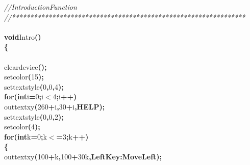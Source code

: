 \documentclass[a4paper, 10pt]{article}
\newcommand\SPC{\hspace*{0.6em}}
\newcommand\HYP{\mbox{\char 45}}
\newcommand\QOT{\mbox{\char 34}}
\newcommand{\CppAComment}[1]{\textit{\textcolor[rgb]{0.2,0.6,1}{#1}}}
\newcommand{\CppAIdentifier}[1]{#1}
\newcommand{\CppANumber}[1]{\textcolor[rgb]{0.5,0,0.5}{#1}}
\newcommand{\CppAReservedWord}[1]{\textbf{#1}}
\newcommand{\CppASpace}[1]{\colorbox[rgb]{1,1,1}{#1}}
\newcommand{\CppAString}[1]{\textbf{\textcolor[rgb]{0,0,1}{#1}}}
\newcommand{\CppASymbol}[1]{\textbf{\textcolor[rgb]{1,0,0}{#1}}}
\begin{document}
\begin{ttfamily}
\CppAComment{//\SPC \SPC \SPC Introduction\SPC Function}\\
\CppAComment{//****************************************************************}\\
\\
\CppAReservedWord{void}\CppASpace{\SPC }\CppAIdentifier{Intro}\CppASymbol{(}\CppASymbol{)}\\
\CppASymbol{\{}\\
\\
\CppASpace{\SPC \SPC \SPC }\CppAIdentifier{cleardevice}\CppASymbol{(}\CppASymbol{)}\CppASymbol{;}\\
\CppASpace{\SPC \SPC \SPC }\CppAIdentifier{setcolor}\CppASymbol{(}\CppANumber{15}\CppASymbol{)}\CppASymbol{;}\\
\CppASpace{\SPC \SPC \SPC }\CppAIdentifier{settextstyle}\CppASymbol{(}\CppANumber{0}\CppASymbol{,}\CppANumber{0}\CppASymbol{,}\CppANumber{4}\CppASymbol{)}\CppASymbol{;}\\
\CppASpace{\SPC \SPC \SPC }\CppAReservedWord{for}\CppASymbol{(}\CppAReservedWord{int}\CppASpace{\SPC }\CppAIdentifier{i}\CppASymbol{=}\CppANumber{0}\CppASymbol{;}\CppAIdentifier{i}\CppASymbol{$<$}\CppANumber{4}\CppASymbol{;}\CppAIdentifier{i}\CppASymbol{++}\CppASymbol{)}\\
\CppASpace{\SPC \SPC \SPC }\CppAIdentifier{outtextxy}\CppASymbol{(}\CppANumber{260}\CppASymbol{+}\CppAIdentifier{i}\CppASymbol{,}\CppANumber{30}\CppASymbol{+}\CppAIdentifier{i}\CppASymbol{,}\CppAString{\QOT HELP\QOT }\CppASymbol{)}\CppASymbol{;}\\
\CppASpace{\SPC \SPC \SPC }\CppAIdentifier{settextstyle}\CppASymbol{(}\CppANumber{0}\CppASymbol{,}\CppANumber{0}\CppASymbol{,}\CppANumber{2}\CppASymbol{)}\CppASymbol{;}\\
\CppASpace{\SPC \SPC \SPC }\CppAIdentifier{setcolor}\CppASymbol{(}\CppANumber{4}\CppASymbol{)}\CppASymbol{;}\\
\CppASpace{\SPC \SPC \SPC }\CppAReservedWord{for}\CppASymbol{(}\CppAReservedWord{int}\CppASpace{\SPC }\CppAIdentifier{k}\CppASymbol{=}\CppANumber{0}\CppASymbol{;}\CppAIdentifier{k}\CppASymbol{$<$=}\CppANumber{3}\CppASymbol{;}\CppAIdentifier{k}\CppASymbol{++}\CppASymbol{)}\\
\CppASpace{\SPC \SPC \SPC }\CppASymbol{\{}\\
\CppASpace{\SPC }\CppAIdentifier{outtextxy}\CppASymbol{(}\CppANumber{100}\CppASymbol{+}\CppAIdentifier{k}\CppASymbol{,}\CppANumber{100}\CppASymbol{+}\CppANumber{30}\CppASymbol{\HYP }\CppAIdentifier{k}\CppASymbol{,}\CppAString{\QOT Left\SPC \SPC Key\SPC \SPC :\SPC Move\SPC Left\QOT }\CppASymbol{)}\CppASymbol{;}\\

\end{ttfamily}
\end{document}
